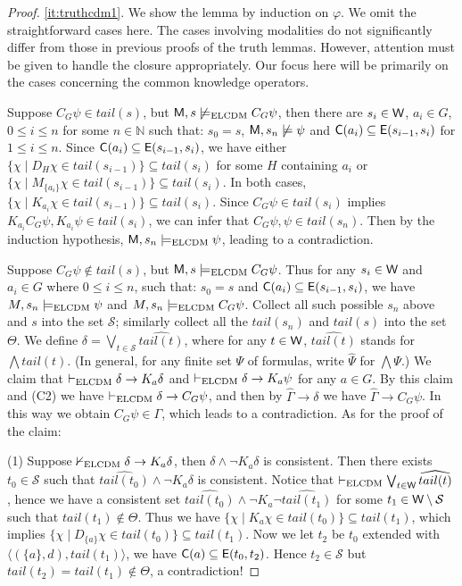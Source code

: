 \documentclass{article}
\newcommand{\CC}{\textnormal{\sf C}\xspace}
\newcommand{\CE}{\textnormal{\sf E}\xspace}
\newcommand{\CM}{\textnormal{\sf M}\xspace}
\newcommand{\CW}{\textnormal{\sf W}\xspace}
\renewcommand{\phi}{\varphi}
\newcommand{\ra}{\rightarrow}
\newcommand{\mbN}{\mathbb{N}}
\newcommand{\mcS}{\mathcal{S}}
\newcommand{\lcdm}{\text{\normalfont ELCDM}\xspace}
\begin{document}
\begin{proof}
\ref{it:truthcdm1}. We show the lemma by induction on $\phi$. We omit the straightforward cases here. The cases involving modalities do not significantly differ from those in previous proofs of the truth lemmas. However, attention must be given to handle the closure appropriately. Our focus here will be primarily on the cases concerning the common knowledge operators.

Suppose $C_G\psi\in tail(s)$, but $\CM,s\not\models_\lcdm C_G\psi$, then there are $s_i\in \CW$, $a_i\in G$, $0\leq i\leq n$ for some $n\in\mbN$ such that: $s_0=s$, $\CM,s_n\not\models\psi$ and $\CC(a_i)\subseteq \CE (s_{i-1},s_i)$ for $1\leq i\leq n$. Since $\CC(a_i)\subseteq \CE (s_{i-1},s_i)$, we have either $\{\chi\mid D_H\chi\in tail(s_{i-1})\}\subseteq tail(s_i)$ for some $H$ containing $a_i$ or $\{\chi\mid M_{\{a_i\}}\chi\in tail(s_{i-1})\}\subseteq tail(s_i)$. In both cases, $\{\chi\mid K_{a_i}\chi\in tail(s_{i-1})\}\subseteq tail(s_i)$. Since $C_G\psi\in tail(s_i)$ implies $K_{a_i}C_G\psi,K_{a_i}\psi\in tail(s_i)$, we can infer that $C_G\psi,\psi\in tail(s_n)$. Then by the induction hypothesis, $\CM,s_n\models_\lcdm \psi$, leading to a contradiction.

Suppose $C_G\psi\not\in tail(s)$, but $\CM,s\models_\lcdm C_G\psi$. Thus for any $s_i\in \CW$ and $a_i\in G$ where $0\leq i\leq n$, such that: $s_0=s$ and $\CC(a_i)\subseteq\CE(s_{i-1},s_i)$, we have $M,s_n\models_\lcdm \psi$ and $M,s_n\models_\lcdm C_G\psi$. Collect all such possible $s_n$ above and $s$ into the set $\mcS$; similarly collect all the $tail(s_n)$ and $tail(s)$ into the set $\Theta$. We define $\delta=\bigvee_{t\in\mcS}\widehat{tail(t)}$, where for any $t \in \CW$, $\widehat{tail(t)}$ stands for $\bigwedge tail(t)$. (In general, for any finite set $\Psi$ of formulas, write $\widehat{\Psi}$ for $\bigwedge\Psi$.)
%
We claim that $\vdash_{\lcdm}\delta\ra K_a\delta$ and $\vdash_{\lcdm}\delta\ra K_a\psi$ for any $a\in G$. By this claim and (C2) we have $\vdash_{\lcdm}\delta\ra C_G\psi$, and then by $\widehat{\Gamma}\ra\delta$ we have $\widehat{\Gamma} \ra C_G\psi$. In this way we obtain $C_G\psi\in\Gamma$, which leads to a contradiction. As for the proof of the claim:

(1) Suppose $\nvdash_{\lcdm}\delta\ra K_a\delta$, then $\delta\wedge \neg K_a\delta$ is consistent. Then there exists $t_0\in\mcS$ such that $\widehat{tail(t_0)}\wedge\neg K_a\delta$ is consistent. Notice that $\vdash_{\lcdm}\bigvee_{t\in \CW}\widehat{tail(t)}$, hence we have a consistent set $\widehat{tail(t_0)}\wedge\neg K_a\neg \widehat{tail(t_1)}$ for some $t_1\in \CW\setminus\mcS$ such that $tail(t_1)\notin\Theta$. Thus we have $\{\chi\mid K_a\chi\in tail(t_0)\}\subseteq tail(t_1)$, which implies $\{\chi\mid D_{\{a\}}\chi\in tail(t_0)\}\subseteq tail(t_1)$. Now we let $t_2$ be $t_0$ extended with $\langle(\{a\},d),tail(t_1)\rangle$, we have $\CC(a)\subseteq\CE(t_0,t_2)$. Hence $t_2\in\mcS$ but $tail(t_2)=tail(t_1)\notin\Theta$, a contradiction!


\end{proof}
\end{document}
